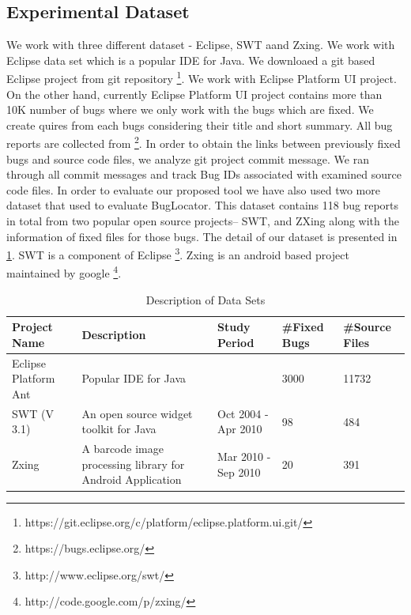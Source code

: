 \documentclass[conference]{IEEEtran}
\begin{document}
\subsection{Experimental Dataset}
We work with three different dataset - Eclipse, SWT aand Zxing.
We work with Eclipse data set which is a popular IDE for Java. We downloaed a git based Eclipse project from git repository \footnote{https://git.eclipse.org/c/platform/eclipse.platform.ui.git/}. We work with Eclipse Platform UI project. 
On the other hand, currently Eclipse Platform UI project contains more than 10K number of bugs where we only work with the bugs which are fixed. We create quires from each bugs considering their title and short summary.
All bug reports are collected from \footnote{https://bugs.eclipse.org/}. In order to obtain the links between previously fixed bugs and source code files, we analyze git project commit message. We ran through all commit messages and track Bug IDs associated with examined source code files. 
In order to evaluate our proposed tool we have also used two more dataset that \citet{Jian} used
to evaluate BugLocator. This dataset contains 118 bug reports in total from two popular open source projects– SWT, and ZXing along with the information of fixed files for those bugs. The detail of our dataset is presented in \ref{tab:DDSl}. SWT is a component of Eclipse \footnote{http://www.eclipse.org/swt/}. Zxing is an android based project maintained by google \footnote{http://code.google.com/p/zxing/}.
\begin{table}[htbp]
	\caption{Description of Data Sets}
	\label{tab:DDSl}
	\begin{center}
		\begin{tabular}{ p{1cm} | p{2.5cm} | p{1.5cm} | p{.75cm} | p{.75cm} }
			\hline
			\textbf{Project Name}  & \textbf{Description} & \textbf{Study Period}& \textbf{\#Fixed Bugs} & \textbf{\#Source Files}\\
			\hline
			{Eclipse Platform Ant} & Popular IDE for Java & & {3000} & 11732\\ \hline
			SWT (V 3.1)& An open source widget toolkit for Java & Oct 2004 - Apr 2010 & 98 & 484 \\ \hline
			Zxing & A barcode image processing library for Android Application & Mar 2010 - Sep 2010 & 20 & 391 \\
			\hline
			
		\end{tabular}
	\end{center}
\end{table}
\end{document}
